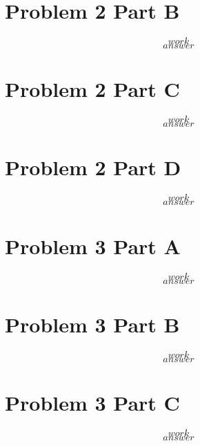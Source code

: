 \documentclass{article}
\begin{document}
\section*{Problem 2 Part B}
\setcounter{equation}{0}
\begin{equation}
work
\end{equation}
\begin{equation*}
answer
\end{equation*}


\section*{Problem 2 Part C}
\setcounter{equation}{0}
\begin{equation}
work
\end{equation}
\begin{equation*}
answer
\end{equation*}


\section*{Problem 2 Part D}
\setcounter{equation}{0}
\begin{equation}
work
\end{equation}
\begin{equation*}
answer
\end{equation*}


\pagebreak

\section*{Problem 3 Part A}
\setcounter{equation}{0}
\begin{equation}
work
\end{equation}
\begin{equation*}
answer
\end{equation*}

\section*{Problem 3 Part B}
\setcounter{equation}{0}
\begin{equation}
work
\end{equation}
\begin{equation*}
answer
\end{equation*}

\section*{Problem 3 Part C}
\setcounter{equation}{0}
\begin{equation}
work
\end{equation}
\begin{equation*}
answer
\end{equation*}
\end{document}
